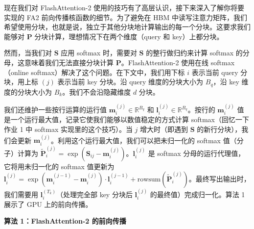 现在我们对 FlashAttention-2 使用的技巧有了高层认识，接下来深入了解你将要实现的 FA2 前向传播核函数的细节。为了避免在 HBM 中读写注意力矩阵，我们希望使用分块，也就是说，独立于其他分块地计算输出的每一个分块。这要求我们能够对 $\boldsymbol{P}$ 分块计算，理想情况下在两个维度（query 和 key）上都分块。

然而，当我们对 $\boldsymbol{S}$ 应用 softmax 时，需要对 $\boldsymbol{S}$ 的整行做归约来计算 softmax 的分母，这意味着我们无法直接分块计算 $\boldsymbol{P}$。FlashAttention-2 使用在线 softmax（online softmax）解决了这个问题。在下文中，我们用下标 $i$ 表示当前 query 分块，用上标 $(j)$ 表示当前 key 分块。沿 query 维度的分块大小为 $B_q$，沿 key 维度的分块大小为 $B_k$。我们不会沿隐藏维度 $d$ 分块。

我们还维护一些按行运算的运行值 $\boldsymbol{m}_i^{(j)} \in \mathbb{R}^{B_q}$ 和 $\boldsymbol{l}_i^{(j)} \in \mathbb{R}^{B_q}$。按行的 $\boldsymbol{m}_i^{(j)}$ 值是一个运行最大值，记录它使我们能够以数值稳定的方式计算 softmax（回忆一下作业 1 中 softmax 实现里的这个技巧）。当 $j$ 增大时（即遇到 $\boldsymbol{S}$ 的新行分块），我们会更新 $\boldsymbol{m}_i^{(j)}$。利用这个运行最大值，我们可以把未归一化的 softmax 值（分子）计算为 $\tilde{\boldsymbol{P}}_i^{(j)} = \exp(\boldsymbol{S}_{ij} - \boldsymbol{m}_i^{(j)})$。$\boldsymbol{l}_i^{(j)}$ 是 softmax 分母的运行代理值，它将用未归一化的 softmax 值更新为 $\boldsymbol{l}_i^{(j)} = \exp(\boldsymbol{m}_i^{(j-1)} - \boldsymbol{m}_i^{(j)}) \cdot \boldsymbol{l}_i^{(j-1)} + \mathrm{rowsum}(\tilde{\boldsymbol{P}}_i^{(j)})$。最终写出输出时，我们需要用 $\boldsymbol{l}_i^{(T_k)}$（处理完全部 key 分块后 $\boldsymbol{l}_i^{(j)}$ 的最终值）完成归一化。算法 1 展示了 GPU 上的前向传播。

\begin{center}
\textbf{算法 1：FlashAttention-2 的前向传播}
\end{center}

